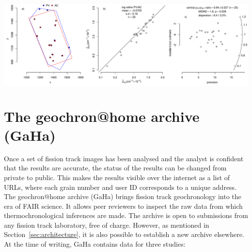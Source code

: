 \documentclass[gchron, manuscript]{copernicus}
\begin{document}
{ \centering \includegraphics[width=\linewidth]{AvP.pdf}
  \label{fig:AvP}
}%

\section{The geochron@home archive (GaHa)}\label{sec:GaHa}

Once a set of fission track images has been analysed and the analyst
is confident that the results are accurate, the status of the results
can be changed from private to public. This makes the results visible
over the internet as a list of URLs, where each grain number and user
ID corresponds to a unique address. The geochron@home archive
(GaHa) brings fission track geochronology into the era of FAIR
science. It allows peer reviewers to inspect the raw data from which
thermochronological inferences are made. The archive is open to
submissions from any fission track laboratory, free of charge.
However, as mentioned in Section~\ref{sec:architecture}, it is also
possible to establish a new archive elsewhere. At the time of writing,
GaHa contains data for three studies:
\end{document}
